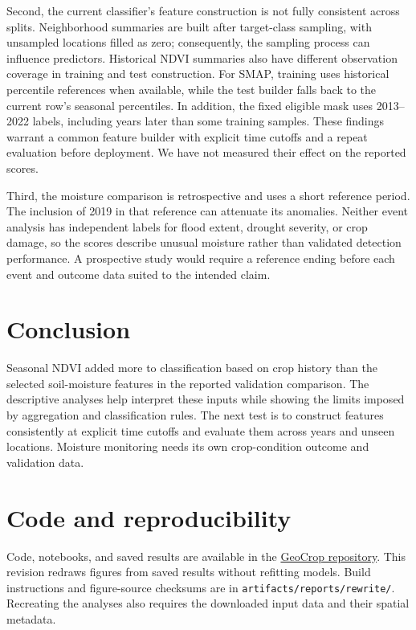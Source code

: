 \documentclass[11pt,letterpaper]{article}
\begin{document}
Second, the current classifier's feature construction is not fully consistent across splits. Neighborhood summaries are built after target-class sampling, with unsampled locations filled as zero; consequently, the sampling process can influence predictors. Historical NDVI summaries also have different observation coverage in training and test construction. For SMAP, training uses historical percentile references when available, while the test builder falls back to the current row's seasonal percentiles. In addition, the fixed eligible mask uses 2013--2022 labels, including years later than some training samples. These findings warrant a common feature builder with explicit time cutoffs and a repeat evaluation before deployment. We have not measured their effect on the reported scores.

Third, the moisture comparison is retrospective and uses a short reference period. The inclusion of 2019 in that reference can attenuate its anomalies. Neither event analysis has independent labels for flood extent, drought severity, or crop damage, so the scores describe unusual moisture rather than validated detection performance. A prospective study would require a reference ending before each event and outcome data suited to the intended claim.

\section{Conclusion}
Seasonal NDVI added more to classification based on crop history than the selected soil-moisture features in the reported validation comparison. The descriptive analyses help interpret these inputs while showing the limits imposed by aggregation and classification rules. The next test is to construct features consistently at explicit time cutoffs and evaluate them across years and unseen locations. Moisture monitoring needs its own crop-condition outcome and validation data.

\section*{Code and reproducibility}
Code, notebooks, and saved results are available in the \href{https://github.com/sardorsob/GeoCrop-Spatiotemporal-Modeling}{GeoCrop repository}. This revision redraws figures from saved results without refitting models. Build instructions and figure-source checksums are in \texttt{artifacts/reports/rewrite/}. Recreating the analyses also requires the downloaded input data and their spatial metadata.

\raggedright


\end{document}
